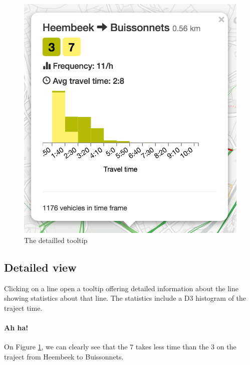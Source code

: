 \documentclass[11pt]{article}%
\begin{document}
\begin{minipage}{0.3\textwidth}
  \begin{figure}[H]
    \includegraphics[width=\textwidth]{images/popup1.png}
    \caption{\label{fig:popup} The detailled tooltip}
  \end{figure}
\end{minipage}\hfill
\begin{minipage}{0.6\textwidth}
    \subsection{Detailed view}
    Clicking on a line open a tooltip offering detailed information about the line showing statistics about that line. The statistics include a D3 histogram of the traject time.
    \paragraph{Ah ha!} On Figure \ref{fig:popup}, we can clearly see that the 7 takes less time than the 3 on the traject from Heembeek to Buissonnets.
\end{minipage}
\end{document}

